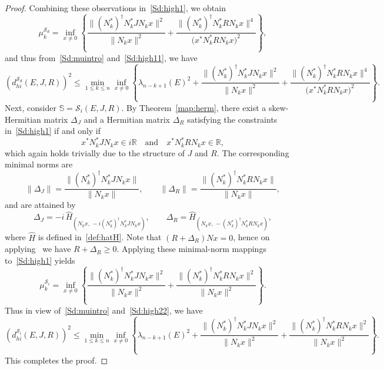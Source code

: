 \documentclass[10pt,a4paper]{amsart}
\begin{document}
\begin{proof}
    Combining these observations in~\eqref{Sd:high1}, we obtain
    \begin{equation}\label{Sd:high11}
    \mu_k^{\mathcal S_d} =  \inf_{x \neq 0} \left\{
    \frac{\|(N_k^*)^{\dagger} N_k^* J N_k x\|^2}{\|N_k x\|^2} +
    \frac{\|(N_k^*)^{\dagger} N_k^* R N_k x\|^4}{\big(x^* N_k^* R N_k x\big)^2} \right\},
    \end{equation}
       and thus from~\eqref{Sd:muintro} and~\eqref{Sd:high11}, we have
    \[
    (d_{hi}^{\mathcal S_d}(E,J,R))^2 \le \min_{1 \le k \le n} \inf_{x \neq 0} \left\{ \lambda_{n-k+1}(E)^2 +
    \frac{\|(N_k^*)^{\dagger} N_k^* J N_k x\|^2}{\|N_k x\|^2} +
    \frac{\|(N_k^*)^{\dagger} N_k^* R N_k x\|^4}{\big(x^* N_k^* R N_k x\big)^2} \right\}.
    \]
    Next, consider $\mathbb S=\mathcal S_i(E,J,R)$. By Theorem~\ref{map:herm}, there exist a skew-Hermitian matrix $\Delta_J$ and a Hermitian matrix $\Delta_R$ satisfying the constraints in~\eqref{Sd:high1} if and only if
    \[
    x^* N_k^* J N_k x \in i\mathbb{R}
    \quad \text{and} \quad
    x^* N_k^* R N_k x \in \mathbb{R},
    \]
    which again holds trivially due to the structure of $J$ and $R$.
    The corresponding minimal norms are
    \[
    \|\Delta_J\| = \frac{\|(N_k^*)^{\dagger} N_k^* J N_k x\|}{\|N_k x\|},
    \qquad
    \|\Delta_R\| = \frac{\|(N_k^*)^{\dagger} N_k^* R N_k x\|}{\|N_k x\|},
    \]
    and are attained by
    \[
    \Delta_J = -i\,\hat H_{(N_k x,\, -i (N_k^*)^{\dagger} N_k^* J N_k x)},
    \qquad
    \Delta_R = \hat H_{(N_k x,\,-(N_k^*)^{\dagger} N_k^* R N_k x)},
    \]
    where $\hat H$ is defined in~\eqref{def:hatH}. Note that $(R+\Delta_R)Nx=0$, hence on applying~\cite[Lemma 4.4]{MehMS16} we have $R+\Delta_R\geq 0$.
    Applying these minimal-norm mappings to~\eqref{Sd:high1} yields
    \begin{equation}\label{Sd:high22}
    \mu_k^{\mathcal S_i} =  \inf_{x \neq 0} \left\{
    \frac{\|(N_k^*)^{\dagger} N_k^* J N_k x\|^2}{\|N_k x\|^2} +
    \frac{\|(N_k^*)^{\dagger} N_k^* R N_k x\|^2}{\|N_k x\|^2} \right\}.
    \end{equation}
    Thus in view of~\eqref{Sd:muintro} and~\eqref{Sd:high22}, we have
    \[
    (d_{hi}^{\mathcal S_i}(E,J,R))^2 \le \min_{1 \le k \le n} \inf_{x \neq 0} \left\{
    \lambda_{n-k+1}(E)^2 +
    \frac{\|(N_k^*)^{\dagger} N_k^* J N_k x\|^2}{\|N_k x\|^2} +
    \frac{\|(N_k^*)^{\dagger} N_k^* R N_k x\|^2}{\|N_k x\|^2} \right\}.
    \]
    This completes the proof.

\end{proof}
\end{document}
